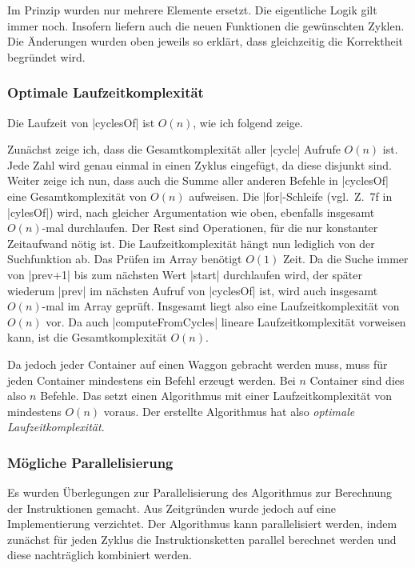 Im Prinzip wurden nur mehrere Elemente ersetzt. Die eigentliche Logik gilt immer noch. Insofern liefern auch die neuen Funktionen die gewünschten Zyklen.
Die Änderungen wurden oben jeweils so erklärt, dass gleichzeitig die Korrektheit begründet wird.

\subsubsection{Optimale Laufzeitkomplexität}
Die Laufzeit von |cyclesOf| ist $O(n)$, wie ich folgend zeige.

Zunächst zeige ich, dass die Gesamtkomplexität aller |cycle| Aufrufe $O(n)$ ist.
Jede Zahl wird genau einmal in einen Zyklus eingefügt, da diese disjunkt sind.
Weiter zeige ich nun, dass auch die Summe aller anderen Befehle in |cyclesOf| eine Gesamtkomplexität von $O(n)$ aufweisen.
Die |for|-Schleife (vgl.\ Z.\ 7f in |cylesOf|) wird, nach gleicher Argumentation wie oben, ebenfalls insgesamt $O(n)$-mal durchlaufen.
Der Rest sind Operationen, für die nur konstanter Zeitaufwand nötig ist. Die Laufzeitkomplexität hängt nun lediglich von der Suchfunktion ab.
Das Prüfen im Array benötigt $O(1)$ Zeit. Da die Suche immer von |prev+1| bis zum nächsten Wert |start| durchlaufen wird, der später wiederum |prev| im nächsten Aufruf von |cyclesOf| ist,
wird auch insgesamt $O(n)$-mal im Array geprüft. Insgesamt liegt also eine Laufzeitkomplexität von $O(n)$ vor.
Da auch |computeFromCycles| lineare Laufzeitkomplexität vorweisen kann, ist die Gesamtkomplexität $O(n)$.

Da jedoch jeder Container auf einen Waggon gebracht werden muss, muss für jeden Container mindestens ein Befehl erzeugt werden.
Bei $n$ Container sind dies also $n$ Befehle. Das setzt einen Algorithmus mit einer Laufzeitkomplexität von mindestens $O(n)$ voraus.
Der erstellte Algorithmus hat also \emph{optimale Laufzeitkomplexität}.

\subsubsection{Mögliche Parallelisierung}
Es wurden Überlegungen zur Parallelisierung des Algorithmus zur Berechnung der Instruktionen gemacht.
Aus Zeitgründen wurde jedoch auf eine Implementierung verzichtet.
Der Algorithmus kann pa\-ral\-le\-li\-siert werden,
indem zunächst für jeden Zyklus die Instruktionsketten parallel berechnet werden und diese nachträglich kombiniert werden.
\clearpage

